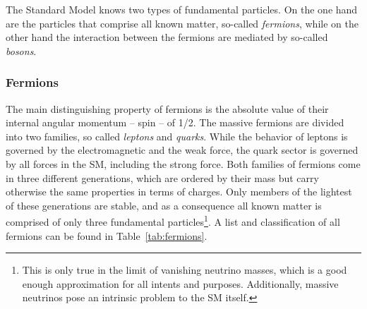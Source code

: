 The Standard Model knows two types of fundamental particles. On the one hand are the particles that comprise
all known matter, so-called \textit{fermions}, while on the other hand the interaction between the fermions
are mediated by so-called \textit{bosons}. 

\subsubsection*{Fermions}

The main distinguishing property of fermions is the absolute value of their internal angular momentum -- spin -- of \num{1/2}. 
The massive fermions are divided into two families, so called \textit{leptons} and
\textit{quarks}. While the behavior of leptons is governed by the electromagnetic and the weak force, the quark
sector is governed by all forces in the SM, including the strong force. Both families of fermions come in three different
generations, which are ordered by their mass but carry otherwise the same properties in terms of charges. Only members of the lightest of these generations are stable, and as a consequence all known 
matter is comprised of only three fundamental particles\footnote{This is only true in the limit of vanishing neutrino masses, which is a good 
enough approximation for all intents and purposes. Additionally, massive neutrinos pose an intrinsic problem to the SM itself.}.
A list and classification of all fermions can be found in Table~\ref{tab:fermions}.


